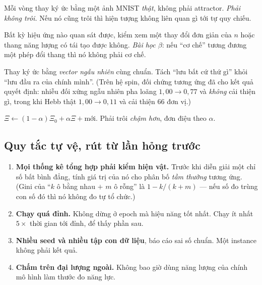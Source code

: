 \documentclass[11pt,a4paper]{article}
\begin{document}
\begin{description}[leftmargin=6mm,style=nextline]
\item[C1 --- không tự quy chiếu (null).] Mỗi vòng thay ký ức bằng một ảnh MNIST
\emph{thật}, không phải attractor. \emph{Phải không trôi.} Nếu nó cũng trôi thì
hiện tượng không liên quan gì tới tự quy chiếu.
\item[C2 --- đổi siêu tham số đơn thuần.] Bất kỳ hiệu ứng nào quan sát được,
kiểm xem một thay đổi đơn giản của $n$ hoặc thang năng lượng có tái tạo được
không. \emph{Bài học $\beta$}: nếu ``cơ chế'' tương đương một phép đổi thang thì
nó không phải cơ chế.
\item[C3 --- lưu trữ ngẫu nhiên.] Thay ký ức bằng \emph{vector ngẫu nhiên} cùng
chuẩn. Tách ``lưu bất cứ thứ gì'' khỏi ``lưu đầu ra của chính mình''. (Trên hệ
spin, đối chứng tương ứng đã cho kết quả quyết định: nhiễu đối xứng ngẫu nhiên
pha loãng $1{,}00\to0{,}77$ và \emph{không} cải thiện gì, trong khi Hebb thật
$1{,}00\to0{,}11$ và cải thiện $66$ đơn vị.)
\item[C4 --- có neo.] $\Xi \leftarrow (1-\alpha)\Xi_0 + \alpha\Xi + \text{mới}$.
Phải trôi \emph{chậm hơn}, đơn điệu theo $\alpha$.
\end{description}

\subsection{Quy tắc tự vệ, rút từ lần hỏng trước}

\begin{enumerate}[leftmargin=7mm,itemsep=1mm]
\item \textbf{Mọi thống kê tổng hợp phải kiểm hiện vật.} Trước khi diễn giải một
chỉ số bất bình đẳng, tính giá trị của nó cho phân bố \emph{tầm thường} tương
ứng. (Gini của ``$k$ ô bằng nhau $+$ $m$ ô rỗng'' là $1-k/(k+m)$ --- nếu số đo
trùng con số đó thì nó không đo tự tổ chức.)
\item \textbf{Chạy quá đỉnh.} Không dừng ở epoch mà hiệu năng tốt nhất. Chạy
ít nhất $5\times$ thời gian tới đỉnh, để thấy phần sau.
\item \textbf{Nhiều seed và nhiều tập con dữ liệu}, báo cáo sai số chuẩn. Một
instance không phải kết quả.
\item \textbf{Chấm trên đại lượng ngoài.} Không bao giờ dùng năng lượng của
chính mô hình làm thước đo năng lực.
\end{enumerate}

\end{document}
